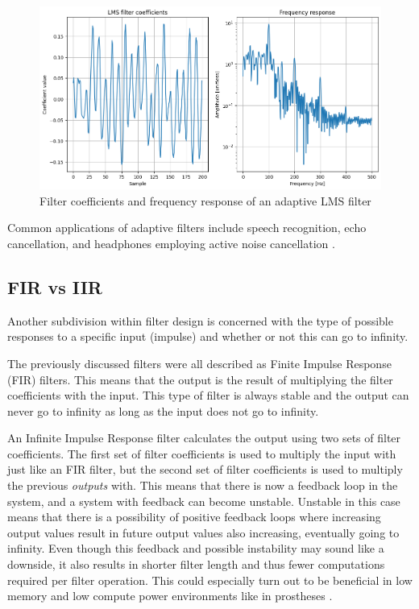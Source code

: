 \begin{figure}[h!t]
	\begin{center}
		\includegraphics[width=1.0\columnwidth]{images/lms_filter_response.png}
	\end{center}
	\caption{Filter coefficients and frequency response of an adaptive LMS filter}
	\label{fig:lms_filter_response}
\end{figure}

Common applications of adaptive filters include speech recognition, echo cancellation, and headphones employing active noise cancellation \cite{active_noise_cancellation_wiener_filter,wiener_vs_adaptive_realtime_noisecancellation}.

\subsection{FIR vs IIR}
Another subdivision within filter design is concerned with the type of possible responses to a specific input (impulse) and whether or not this can go to infinity.

The previously discussed filters were all described as Finite Impulse Response (FIR) filters. This means that the output is the result of multiplying the filter coefficients with the input. This type of filter is always stable and the output can never go to infinity as long as the input does not go to infinity.

An Infinite Impulse Response filter calculates the output using two sets of filter coefficients. The first set of filter coefficients is used to multiply the input with just like an FIR filter, but the second set of filter coefficients is used to multiply the previous \textit{outputs} with. This means that there is now a feedback loop in the system, and a system with feedback can become unstable. Unstable in this case means that there is a possibility of positive feedback loops where increasing output values result in future output values also increasing, eventually going to infinity. Even though this feedback and possible instability may sound like a downside, it also results in shorter filter length and thus fewer computations required per filter operation. This could especially turn out to be beneficial in low memory and low compute power environments like in prostheses \cite{fir_vs_iir}.

